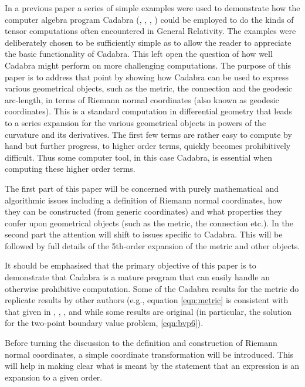 \documentclass[a4paper,12pt]{article}
\numberwithin{equation}{section}
\begin{document}
In a previous paper \cite{brewin:2009-02} a series of simple examples were used to
demonstrate how the computer algebra program Cadabra
(\cite{peeters:2007-02},
\cite{peeters:2018-01},
\cite{peeters:2017-01},
\cite{peeters:2017-02})
could be employed to do the kinds of tensor computations often encountered in General
Relativity. The examples were deliberately chosen to be sufficiently simple as to allow the
reader to appreciate the basic functionality of Cadabra. This left open the question of how
well Cadabra might perform on more challenging computations. The purpose of this paper is to
address that point by showing how Cadabra can be used to express various geometrical
objects, such as the metric, the connection and the geodesic arc-length, in terms of Riemann
normal coordinates (also known as geodesic coordinates). This is a standard computation in
differential geometry that leads to a series expansion for the various geometrical objects
in powers of the curvature and its derivatives. The first few terms are rather easy to
compute by hand but further progress, to higher order terms, quickly becomes prohibitively
difficult. Thus some computer tool, in this case Cadabra, is essential when computing these
higher order terms.

The first part of this paper will be concerned with purely mathematical and algorithmic
issues including a definition of Riemann normal coordinates, how they can be constructed
(from generic coordinates) and what properties they confer upon geometrical objects (such as
the metric, the connection etc.). In the second part the attention will shift to issues
specific to Cadabra. This will be followed by full details of the 5th-order expansion of the
metric and other objects.

It should be emphasised that the primary objective of this paper is to demonstrate that
Cadabra is a mature program that can easily handle an otherwise prohibitive computation.
Some of the Cadabra results for the metric do replicate results by other authors (e.g.,
equation \eqref{eqn:metric} is consistent with that given in
\cite{hatzinikitas:2000-01},
\cite{higashijima:2002-01},
\cite{yamashita:1984-01},
and
\cite{muller:1997-01}
while some results are original (in particular, the solution for the two-point boundary value
problem, \eqref{eqn:bvp6}).

Before turning the discussion to the definition and construction of Riemann normal
coordinates, a simple coordinate transformation will be introduced. This will help in making
clear what is meant by the statement that an expression is an expansion to a given order.
\end{document}
